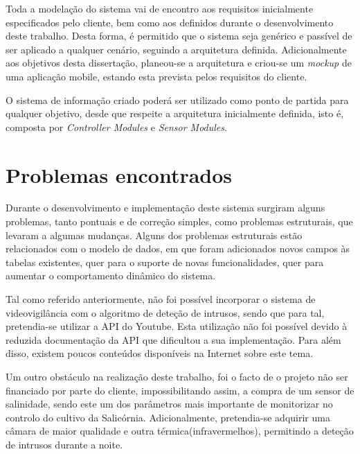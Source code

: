 Toda a modelação do sistema vai de encontro aos requisitos inicialmente especificados pelo cliente, bem como aos definidos durante o desenvolvimento deste trabalho. Desta forma, é permitido que o sistema seja genérico e passível de ser aplicado a qualquer cenário, seguindo a arquitetura definida. Adicionalmente aos objetivos desta dissertação, planeou-se a arquitetura e criou-se um \textit{mockup} de uma aplicação mobile, estando esta prevista pelos requisitos do cliente. 


O sistema de informação criado poderá ser utilizado como ponto de partida para qualquer objetivo, desde que respeite a arquitetura inicialmente definida, isto é, composta por \textit{Controller Modules} e \textit{Sensor Modules}. 



\section{Problemas encontrados}


Durante o desenvolvimento e implementação deste sistema surgiram alguns problemas, tanto pontuais e de correção simples, como
problemas estruturais, que levaram a algumas mudanças. Alguns dos problemas estruturais estão relacionados com o modelo de dados, em que foram adicionados novos campos às tabelas existentes, quer para o suporte de novas funcionalidades, quer para aumentar o comportamento dinâmico do sistema.

Tal como referido anteriormente, não foi possível incorporar o sistema de videovigilância com o algoritmo de deteção de intrusos, sendo que para tal, pretendia-se utilizar a \ac{API} do Youtube. Esta utilização não foi possível devido à reduzida documentação da API que dificultou a sua implementação. Para além disso, existem poucos conteúdos disponíveis na Internet sobre este tema. 




Um outro obstáculo na realização deste trabalho, foi o facto de o projeto não ser financiado por parte do cliente, impossibilitando assim, a compra de um sensor de salinidade, sendo este um dos parâmetros mais importante de monitorizar no controlo do cultivo da Salicórnia. Adicionalmente, pretendia-se adquirir uma câmara de maior qualidade e outra térmica(infravermelhos), permitindo a deteção de intrusos durante a noite. 






